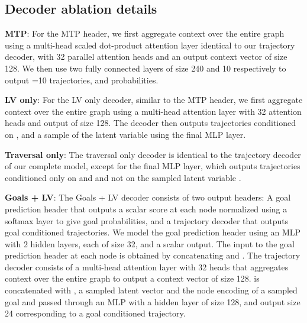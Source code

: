 \documentclass{article}
\begin{document}
\subsection{Decoder ablation details}
\label{appendix:decoder_blations}
 \textbf{MTP}: For the MTP header, we first aggregate context over the entire graph using a multi-head scaled dot-product attention layer identical to our trajectory decoder, with 32 parallel attention heads and an output context vector  of size 128. We then use two fully connected layers of size 240 and 10 respectively to output =10 trajectories, and  probabilities.   

\textbf{LV only}: For the LV only decoder, similar to the MTP header, we first aggregate context over the entire graph using a multi-head attention layer with 32 attention heads and output  of size 128. The decoder then outputs trajectories conditioned on ,  and a sample  of the latent variable using the final MLP layer.  

\textbf{Traversal only}: The traversal only decoder is identical to the trajectory decoder of our complete model, except for the final MLP layer, which outputs trajectories conditioned only on  and  and not on the sampled latent variable .

\textbf{Goals + LV}: The Goals + LV decoder consists of two output headers:  A goal prediction header that outputs a scalar score at each node normalized using a softmax layer to give goal probabilities, and a trajectory decoder that outputs goal conditioned trajectories. We model the goal prediction header using an MLP with 2 hidden layers, each of size 32, and a scalar output. The input to the goal prediction header at each node is obtained by concatenating  and . The trajectory decoder consists of a multi-head attention layer with 32 heads that aggregates context over the entire graph to output a context vector  of size 128.  is concatenated with , a sampled latent vector  and the node encoding of a sampled goal  and passed through an MLP with a hidden layer of size 128, and output size 24 corresponding to a goal conditioned trajectory. 
\end{document}
